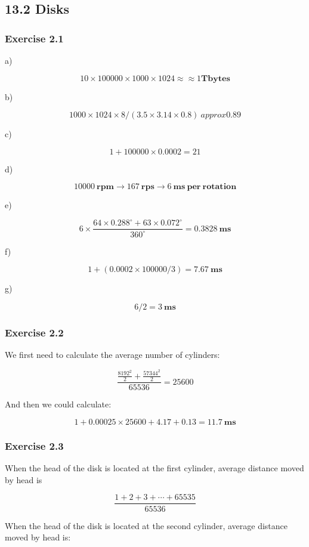 \documentclass[../../main.tex]{subfiles}
\begin{document}
\subsection*{13.2 Disks}

\subsubsection*{Exercise 2.1}

a)

$$
10 \times 100000 \times 1000 \times 1024 \approx≈ 1 \mathbf{Tbytes}
$$

b)

$$
1000 \times 1024 \times 8 / (3.5 \times 3.14 \times 0.8)\ approx 0.89
$$

c)

$$
1 + 100000 \times 0.0002 = 21
$$

d)

$$
10000 \ \mathbf{rpm} \to 167 \ \mathbf{rps} \to 6 \ \mathbf{ms \ per \ rotation}
$$

e)

$$
6 \times \frac{64 \times 0.288^{\circ}  + 63 \times 0.072^{\circ}}{360^{\circ}} = 0.3828 \ \mathbf{ms}
$$

f)

$$
1 + (0.0002 \times 100000 / 3)=7.67 \ \mathbf{ms}
$$

g)

$$
6 / 2 = 3 \ \mathbf{ms}
$$

\subsubsection*{Exercise 2.2}

We first need to calculate the average number of cylinders:

$$
\frac{\frac{8192^2}{2} + \frac{57344^2}{2}}{65536} = 25600
$$

And then we could calculate:

$$
1 + 0.00025 \times 25600 + 4.17 + 0.13 = 11.7 \ \mathbf{ms}
$$

\subsubsection*{Exercise 2.3}

When the head of the disk is located at the first cylinder, average
distance moved by head is

$$
\frac{1 + 2 + 3  + \cdots + 65535}{65536}
$$

When the head of the disk is located at the second cylinder, average
distance moved by head is:
\end{document}
